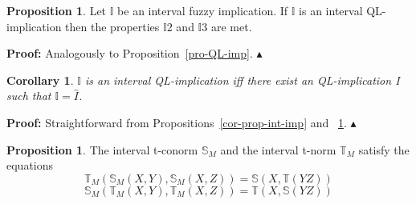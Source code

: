 \documentclass[conference]{IEEEtran}
\theoremstyle{plain}
\newtheorem{corollary}[theorem]{Corollary}
\theoremstyle{remark}
\theoremstyle{definition}
\theoremstyle{proposition}
\newtheorem{proposition}[theorem]{Proposition}
\newcommand{\II}{\mathbb{I} }
\newcommand{\NN}{\mathbb{N} }
\newcommand{\TT}{\mathbb{T} }
\newcommand{\Ss}{\mathbb{S} }
\newcommand{\prova}[1]{\noindent\textbf{Proof:} #1\hfill
{\small $\blacktriangle$}\\}
\begin{document}

\begin{proposition}\label{pro-int-QLimp-prop2}
Let $\II$ be an interval fuzzy implication. If $\II$ is an
interval QL-implication then the properties $\II 2$ and $\II 3$
are met.
\end{proposition}

\prova{Analogously to Proposition~\ref{pro-QL-imp}.}


\begin{corollary}
$\II$ is an interval QL-implication iff there exist an
QL-implication I such that $\mathbb{I}=\widehat{I}$.
\end{corollary}
\prova{Straightforward from Propositions~\ref{cor-prop-int-imp}
and ~\ref{pro-int-QLimp-prop2}.}

\begin{proposition}\label{pro-QL-imp2-int}
The interval t-conorm $\Ss_{M}$ and the interval t-norm $\TT_M$
satisfy the equations
\begin{equation}\label{dist_tnorm_tconor}
\mathbb{T}_M(\mathbb{S}_M(X,Y),\mathbb{S}_M(X,Z))=\mathbb{S}(X,
\mathbb{T}(YZ))
\end{equation}
\begin{equation}
\mathbb{S}_M(\mathbb{T}_M(X,Y),\mathbb{T}_M(X,Z))=\mathbb{T}(X,
\mathbb{S}(YZ))
\end{equation}
\end{proposition}



\end{document}
